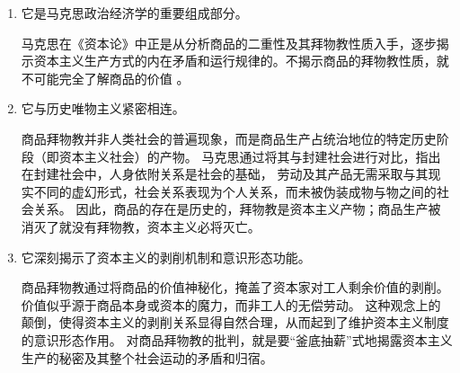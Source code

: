\begin{enumerate}
    \item 它是马克思政治经济学的重要组成部分。

    马克思在《资本论》中正是从分析商品的二重性及其拜物教性质入手，逐步揭示资本主义生产方式的内在矛盾和运行规律的。不揭示商品的拜物教性质，就不可能完全了解商品的价值 。  

    \item 它与历史唯物主义紧密相连。

    商品拜物教并非人类社会的普遍现象，而是商品生产占统治地位的特定历史阶段（即资本主义社会）的产物。
    马克思通过将其与封建社会进行对比，指出在封建社会中，人身依附关系是社会的基础，
    劳动及其产品无需采取与其现实不同的虚幻形式，社会关系表现为个人关系，而未被伪装成物与物之间的社会关系。
    因此，商品的存在是历史的，拜物教是资本主义产物；商品生产被消灭了就没有拜物教，资本主义必将灭亡。

    \item 它深刻揭示了资本主义的剥削机制和意识形态功能。

    商品拜物教通过将商品的价值神秘化，掩盖了资本家对工人剩余价值的剥削。
    价值似乎源于商品本身或资本的魔力，而非工人的无偿劳动。
    这种观念上的颠倒，使得资本主义的剥削关系显得自然合理，从而起到了维护资本主义制度的意识形态作用。
    对商品拜物教的批判，就是要“釜底抽薪”式地揭露资本主义生产的秘密及其整个社会运动的矛盾和归宿\autocite{sxg}。
\end{enumerate}